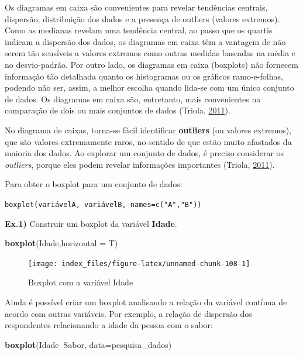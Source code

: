 \documentclass[12pt,brazil,oneside]{book}
\newenvironment{Shaded}{\begin{snugshade}}{\end{snugshade}}
\newcommand{\DataTypeTok}[1]{\textcolor[rgb]{0.13,0.29,0.53}{#1}}
\newcommand{\KeywordTok}[1]{\textcolor[rgb]{0.13,0.29,0.53}{\textbf{#1}}}
\newcommand{\NormalTok}[1]{#1}
\newcommand{\OperatorTok}[1]{\textcolor[rgb]{0.81,0.36,0.00}{\textbf{#1}}}
\begin{document}
Os diagramas em caixa são convenientes para revelar tendências centrais, dispersão, distribuição dos dados e a presença de outliers (valores extremos). Como as medianas revelam uma tendência central, ao passo que os quartis indicam a dispersão dos dados, os diagramas em caixa têm a vantagem de não serem tão sensíveis a valores extremos como outras medidas baseadas na média e no desvio-padrão. Por outro lado, os diagramas em caixa (boxplots) não fornecem informação tão detalhada quanto os histogramas ou os gráficos ramo-e-folhas, podendo não ser, assim, a melhor escolha quando lida-se com um único conjunto de dados. Os diagramas em caixa são, entretanto, mais convenientes na comparação de dois ou mais conjuntos de dados (Triola, \protect\hyperlink{ref-triola1999}{2011}).

No diagrama de caixas, torna-se fácil identificar \textbf{outliers} (ou valores extremos), que são valores extremamente raros, no sentido de que estão muito afastados da maioria dos dados. Ao explorar um conjunto de dados, é preciso considerar os \emph{outliers}, porque eles podem revelar informações importantes (Triola, \protect\hyperlink{ref-triola1999}{2011}).

Para obter o boxplot para um conjunto de dados:

\texttt{boxplot(variávelA,\ variávelB,\ names=c("A","B"))}

\textbf{Ex.1)} Construir um boxplot da variável \textbf{Idade}.

\begin{Shaded}
\begin{Highlighting}[]
\KeywordTok{boxplot}\NormalTok{(Idade,}\DataTypeTok{horizontal =}\NormalTok{ T)}
\end{Highlighting}
\end{Shaded}

\begin{figure}[H]

{\centering \texttt{[image: index\_files/figure-latex/unnamed-chunk-108-1]} 

}

\caption{Boxplot com a variável Idade}\label{fig:unnamed-chunk-108}
\end{figure}

Ainda é possível criar um boxplot analisando a relação da variável contínua de acordo com outras variáveis. Por exemplo, a relação de dispersão dos respondentes relacionando a idade da pessoa com o sabor:

\begin{Shaded}
\begin{Highlighting}[]
\KeywordTok{boxplot}\NormalTok{(Idade}\OperatorTok{~}\NormalTok{Sabor, }\DataTypeTok{data=}\NormalTok{pesquisa_dados)}
\end{Highlighting}
\end{Shaded}
\end{document}
